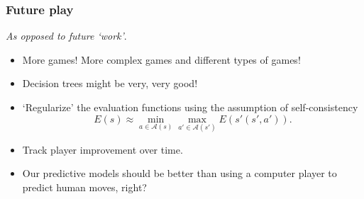 \documentclass{beamer}
\begin{document}
\begin{frame}
\frametitle{Future play}
\emph{As opposed to future `work'}.
\begin{itemize}
\item More games! More complex games and different types of games!
\item Decision trees might be very, very good!
\item `Regularize' the evaluation functions using the assumption of self-consistency
\[
E(s) \approx \min_{a \in \mathcal{A}(s)} \max_{a' \in \mathcal{A}(s')} E(s'(s', a')).
\]
\item Track player improvement over time.
\item Our predictive models should be better than using a computer player to predict human moves, right?
\end{itemize}
\end{frame}
\end{document}
